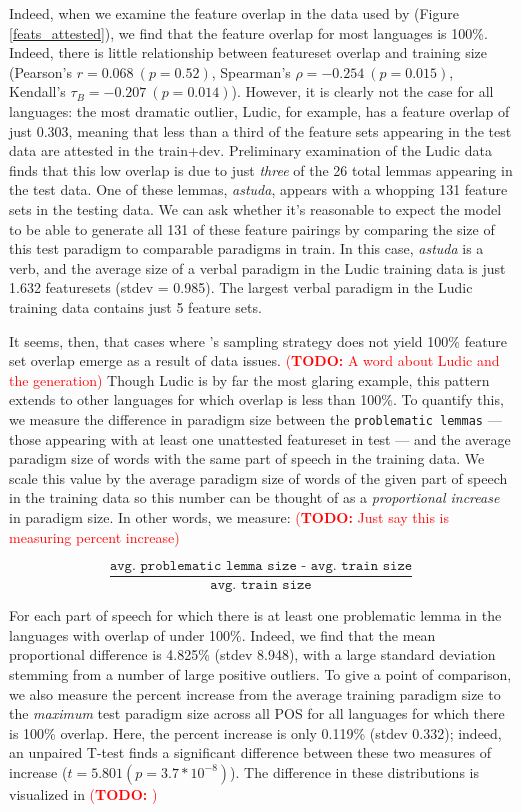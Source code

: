 \documentclass[11pt]{article}
\newcommand{\todo}[1]{\textcolor{red}{(\textbf{TODO:} #1)}}
\begin{document}
Indeed, when we examine the feature overlap in the data used by \citet{goldman-etal-2022-un} (Figure \ref{feats_attested}), we find that the feature overlap for most languages is 100\%. 
Indeed, there is little relationship between featureset overlap and training size (Pearson's $r = 0.068~(p=0.52)$, Spearman's $\rho = -0.254~(p=0.015)$, Kendall's $\tau_B = -0.207~(p = 0.014)$).
However, it is clearly not the case for all languages: the most dramatic outlier, Ludic, for example, has a feature overlap of just 0.303, meaning that less than a third of the feature sets appearing in the test data are attested in the train+dev. 
Preliminary examination of the Ludic data finds that this low overlap is due to just \textit{three} of the 26 total lemmas appearing in the test data. 
One of these lemmas, \textit{astuda}, appears with a whopping 131 feature sets in the testing data. 
We can ask whether it's reasonable to expect the model to be able to generate all 131 of these feature pairings by comparing the size of this test paradigm to comparable paradigms in train. 
In this case, \textit{astuda} is a verb, and the average size of a verbal paradigm in the Ludic training data is just 1.632 featuresets (stdev = 0.985). 
The largest verbal paradigm in the Ludic training data contains just 5 feature sets. 

It seems, then, that cases where \citeauthor{goldman-etal-2022-un}'s sampling strategy does not yield 100\% feature set overlap emerge as a result of data issues. 
\todo{A word about Ludic and the generation}
Though Ludic is by far the most glaring example, this pattern extends to other languages for which overlap is less than 100\%. 
To quantify this, we measure the difference in paradigm size between the \texttt{problematic lemmas} --- those appearing with at least one unattested featureset in test --- and the average paradigm size of words with the same part of speech in the training data.
We scale this value by the average paradigm size of words of the given part of speech in the training data so this number can be thought of as a \textit{proportional increase} in paradigm size.  
In other words, we measure: \todo{Just say this is measuring percent increase} 

\begin{footnotesize}
$$\frac{\texttt{avg. problematic lemma size - avg. train size}}{\texttt{avg. train size}}$$
\end{footnotesize}

For each part of speech for which there is at least one problematic lemma in the languages with overlap of under 100\%. 
Indeed, we find that the mean proportional difference is 4.825\% (stdev 8.948), with a large standard deviation stemming from a  number of large positive outliers. 
To give a point of comparison, we also measure the percent increase from the average training paradigm size to the \textit{maximum} test paradigm size across all POS for all languages for which there is 100\% overlap. 
Here, the percent increase is only 0.119\% (stdev 0.332); indeed, an unpaired T-test finds a significant difference between these two measures of increase ($t=5.801 (p=3.7*10^{-8})$).
The difference in these distributions is visualized in \todo{}
\end{document}
